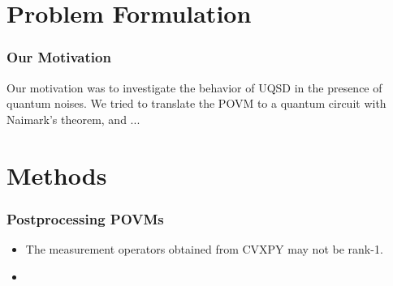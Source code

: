 \documentclass{beamer}
\begin{document}
% 


\section{Problem Formulation}
\begin{frame}
  \frametitle{Our Motivation}
  Our motivation was to investigate the behavior of UQSD in the presence
  of quantum noises. We tried to translate the POVM to a quantum circuit
  with Naimark's theorem, and ...
\end{frame}

\section{Methods}
\begin{frame}
  \frametitle{Postprocessing POVMs}
  \begin{itemize}
    \item The measurement operators obtained from CVXPY may not be rank-1.
    \item
  \end{itemize}
\end{frame}
\end{document}

